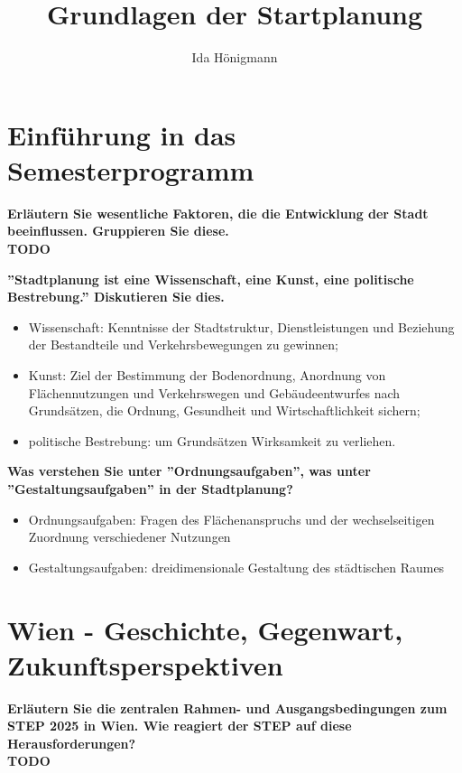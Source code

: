 \documentclass[]{article}
\title{Grundlagen der Startplanung}
\author{Ida Hönigmann}
\newenvironment{question}{\vspace{8mm}\noindent\bfseries}{\\}
\begin{document}
\maketitle

\section{Einführung in das Semesterprogramm}
\begin{question}
	Erläutern Sie wesentliche Faktoren, die die Entwicklung der Stadt beeinflussen. Gruppieren Sie diese.
\end{question}
TODO

\begin{question}
	''Stadtplanung ist eine Wissenschaft, eine Kunst, eine politische Bestrebung.'' Diskutieren Sie dies.
\end{question}
\begin{itemize}
	\item Wissenschaft: Kenntnisse der Stadtstruktur, Dienstleistungen und Beziehung der Bestandteile und Verkehrsbewegungen zu gewinnen;
	\item Kunst: Ziel der Bestimmung der Bodenordnung, Anordnung von Flächennutzungen und Verkehrswegen und Gebäudeentwurfes nach Grundsätzen, die Ordnung, Gesundheit und Wirtschaftlichkeit sichern;
	\item politische Bestrebung: um Grundsätzen Wirksamkeit zu verliehen.
\end{itemize}

\begin{question}
	Was verstehen Sie unter ''Ordnungsaufgaben'', was unter ''Gestaltungsaufgaben'' in der Stadtplanung?
\end{question}
\begin{itemize}
	\item Ordnungsaufgaben: Fragen des Flächenanspruchs und der wechselseitigen Zuordnung verschiedener Nutzungen
	\item Gestaltungsaufgaben: dreidimensionale Gestaltung des städtischen Raumes
\end{itemize}

\section{Wien - Geschichte, Gegenwart, Zukunftsperspektiven}
\begin{question}
	Erläutern Sie die zentralen Rahmen- und Ausgangsbedingungen zum STEP 2025 in Wien. Wie reagiert der STEP auf diese Herausforderungen?
\end{question}
TODO
\end{document}
